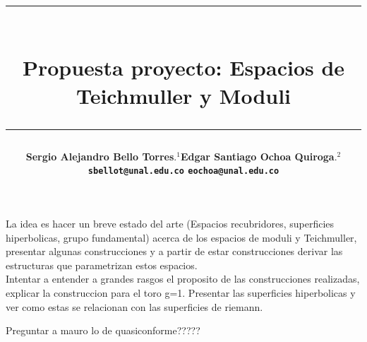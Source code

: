 \documentclass[12pt]{article}
\title{\vspace{-2cm}\par\noindent\rule{16cm}{1pt}\large
\\\bfseries Propuesta proyecto: Espacios de Teichmuller y Moduli
\vspace{-0.34cm}\par\noindent\hspace{0.15cm}\rule{16cm}{1pt}
\vspace{-0.6cm}
}
\author{\small \bfseries Sergio Alejandro Bello Torres$.^{1}$\quad \quad\small Edgar Santiago Ochoa Quiroga$.^{2}$\\ \small \quad \texttt{sbellot@unal.edu.co} \quad \quad \quad \quad \quad \quad \texttt{eochoa@unal.edu.co}\quad\quad \quad\\}
\begin{document}
\maketitle
La idea es hacer un breve estado del arte (Espacios recubridores, superficies hiperbolicas, grupo fundamental) acerca de los espacios de moduli y Teichmuller, presentar algunas construcciones y a partir de estar construcciones derivar las estructuras que parametrizan estos espacios.\\

Intentar a entender a grandes rasgos el proposito de las construcciones realizadas, explicar la construccion para el toro g=1. Presentar las superficies hiperbolicas y ver como estas se relacionan con las superficies de riemann.

Preguntar a mauro lo de quasiconforme?????
\end{document}
